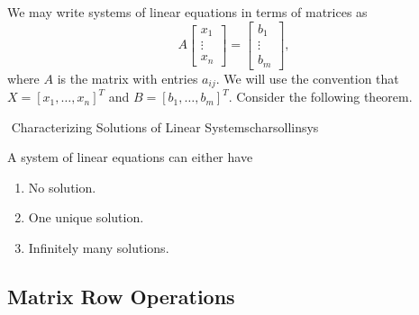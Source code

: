         We may write systems of linear equations in terms of matrices as
        \begin{equation*}
            A\begin{bmatrix} x_1 \\ \vdots \\ x_n \end{bmatrix}=\begin{bmatrix} b_1 \\ \vdots \\ b_m \end{bmatrix},
        \end{equation*}
        where \(A\) is the matrix with entries \(a_{ij}\). We will use the convention that \(X=[x_1,\ldots,x_n]^T\) and \(B=[b_1,
        \ldots,b_m]^T\). Consider the following theorem.
        \begin{theorem}{\Stop\,\,Characterizing Solutions of Linear Systems}{charsollinsys}
            
            A system of linear equations can either have
            \begin{enumerate}
                \item No solution.
                \item One unique solution.
                \item Infinitely many solutions.
            \end{enumerate}
            
        \end{theorem}

    \subsection{Matrix Row Operations}
    
